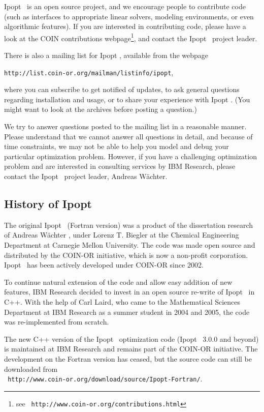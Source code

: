 \documentclass[10pt]{article}
\newcommand{\Ipopt}{{\sc Ipopt }}
\begin{document}
\Ipopt\ is an open source project, and we encourage people to
contribute code (such as interfaces to appropriate linear solvers,
modeling environments, or even algorithmic features).  If you are
interested in contributing code, please have a look at the COIN
contributions webpage\footnote{see \tt
  http://www.coin-or.org/contributions.html}, and contact the \Ipopt\
project leader.

There is also a mailing list for \Ipopt, available from the webpage
\begin{center}
\texttt{http://list.coin-or.org/mailman/listinfo/ipopt},
\end{center}
where you can subscribe to get notified of updates, to ask general
questions regarding installation and usage, or to share your
experience with \Ipopt. (You might want to look at the archives before
posting a question.)

We try to answer questions posted to the mailing list in a reasonable
manner.  Please understand that we cannot answer all questions in
detail, and because of time constraints, we may not be able to help
you model and debug your particular optimization problem.  However, if
you have a challenging optimization problem and are interested in
consulting services by IBM Research, please contact the \Ipopt\
project leader, Andreas W\"achter.

\subsection{History of \Ipopt}
The original \Ipopt\ (Fortran version) was a product of the dissertation
research of Andreas W\"achter \cite{WaechterPhD}, under Lorenz
T. Biegler at the Chemical Engineering Department at Carnegie Mellon
University. The code was made open source and distributed by the
COIN-OR initiative, which is now a non-profit corporation.  \Ipopt\ has
been actively developed under COIN-OR since 2002.

To continue natural extension of the code and allow easy addition of
new features, IBM Research decided to invest in an open source
re-write of \Ipopt\ in C++.  With the help of Carl Laird, who came to
the Mathematical Sciences Department at IBM Research as a summer
student in 2004 and 2005, the code was re-implemented from
scratch.

The new C++ version of the \Ipopt\ optimization code (\Ipopt\ 3.0.0
and beyond) is maintained at IBM Research and remains part of the
COIN-OR initiative. The development on the Fortran version has
ceased, but the source code can still be downloaded from\\ {\tt
  http://www.coin-or.org/download/source/Ipopt-Fortran/}.
\end{document}
